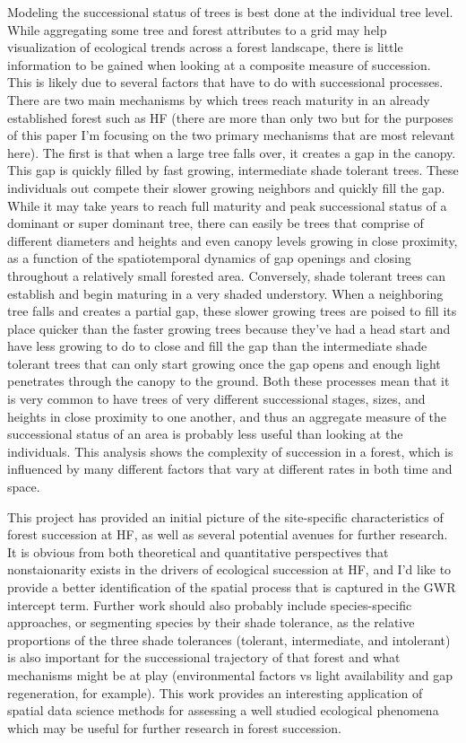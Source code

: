 \documentclass[12pt,a4paper]{article}
\begin{document}
Modeling the successional status of trees is best done at the individual tree level.  While aggregating some tree and forest attributes to a grid may help visualization of ecological trends across a forest landscape, there is little information to be gained when looking at a composite measure of succession.  This is likely due to several factors that have to do with successional processes.  There are two main mechanisms by which trees reach maturity in an already established forest such as HF (there are more than only two but for the purposes of this paper I'm focusing on the two primary mechanisms that are most relevant here).  The first is that when a large tree falls over, it creates a gap in the canopy.  This gap is quickly filled by fast growing, intermediate shade tolerant trees.  These individuals out compete their slower growing neighbors and quickly fill the gap.  While it may take years to reach full maturity and peak successional status of a dominant or super dominant tree, there can easily be trees that comprise of different diameters and heights and even canopy levels growing in close proximity, as a function of the spatiotemporal dynamics of gap openings and closing throughout a relatively small forested area.  Conversely, shade tolerant trees can establish and begin maturing in a very shaded understory.  When a neighboring tree falls and creates a partial gap, these slower growing trees are poised to fill its place quicker than the faster growing trees because they've had a head start and have less growing to do to close and fill the gap than the intermediate shade tolerant trees that can only start growing once the gap opens and enough light penetrates through the canopy to the ground.  Both these processes mean that it is very common to have trees of very different successional stages, sizes, and heights in close proximity to one another, and thus an aggregate measure of the successional status of an area is probably less useful than looking at the individuals.  This analysis shows the complexity of succession in a forest, which is influenced by many different factors that vary at different rates in both time and space.  

This project has provided an initial picture of the site-specific characteristics of forest succession at HF, as well as several potential avenues for further research.  It is obvious from both theoretical and quantitative perspectives that nonstaionarity exists in the drivers of ecological succession at HF, and I'd like to provide a better identification of the spatial process that is captured in the GWR intercept term.  Further work should also probably include species-specific approaches, or segmenting species by their shade tolerance, as the relative proportions of the three shade tolerances (tolerant, intermediate, and intolerant) is also important for the successional trajectory of that forest and what mechanisms might be at play (environmental factors vs light availability and gap regeneration, for example).  This work provides an interesting application of spatial data science methods for assessing a well studied ecological phenomena which may be useful for further research in forest succession.
\end{document}

